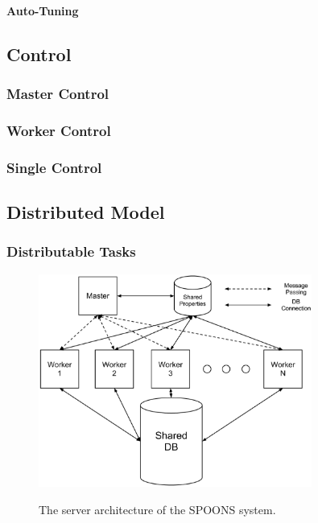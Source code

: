 \documentclass[12pt]{ucthesis}
\newcommand{\captionfonts}{\small\bf\ssp}
\begin{document}
\paragraph{Auto-Tuning}
\label{arch-autotuning}

\subsection{Control}
\label{arch-control}

\subsubsection{Master Control}
\label{arch-master-control}

\subsubsection{Worker Control}
\label{arch-worker-control}

\subsubsection{Single Control}
\label{arch-single-control}

\subsection{Distributed Model}
\label{arch-dist}

\subsubsection{Distributable Tasks}
\label{arch-tasks}

\begin{figure}
   \begin{center}
      \includegraphics[width=0.8\textwidth]{images/SPOONS_Server_Architecture.eps}
      \captionfonts
      \caption[SPOONS Server Architecture]{The server architecture of the SPOONS system.}
      \label{fig:serverArch}
   \end{center}
\end{figure}
\end{document}
